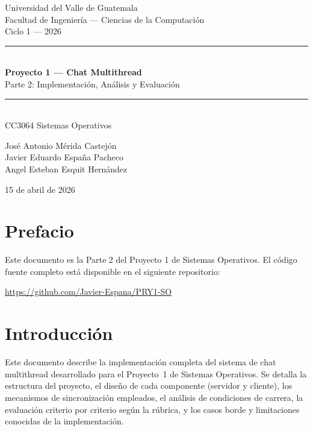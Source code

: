 \documentclass[12pt,a4paper]{article}
\begin{document}
\begin{titlepage}
\centering
\vspace*{2cm}
{\large Universidad del Valle de Guatemala\\
Facultad de Ingeniería --- Ciencias de la Computación\\
Ciclo 1 --- 2026\\[1cm]}

\rule{\textwidth}{1pt}\\[0.4cm]
{\Huge\bfseries Proyecto 1 --- Chat Multithread\\[0.2cm]}
{\Large Parte 2: Implementación, Análisis y Evaluación}\\[0.2cm]
\rule{\textwidth}{1pt}\\[1cm]

{\large CC3064 Sistemas Operativos\\[2cm]}

{\large
José Antonio Mérida Castejón\\
Javier Eduardo España Pacheco\\
Angel Esteban Esquit Hernández\\[2cm]}

{\large 15 de abril de 2026}
\end{titlepage}

\section*{Prefacio}

Este documento es la Parte 2 del Proyecto 1 de Sistemas Operativos. El código fuente completo está disponible en el siguiente repositorio:

\begin{center}
\large \url{https://github.com/Javier-Espana/PRY1-SO}
\end{center}

\newpage

\tableofcontents
\newpage

\section{Introducción}

Este documento describe la implementación completa del sistema de chat multithread
desarrollado para el Proyecto~1 de Sistemas Operativos.  Se detalla la estructura del proyecto,
el diseño de cada componente (servidor y cliente), los mecanismos de sincronización
empleados, el análisis de condiciones de carrera, la evaluación criterio por criterio
según la rúbrica, y los casos borde y limitaciones conocidas de la implementación.
\end{document}
